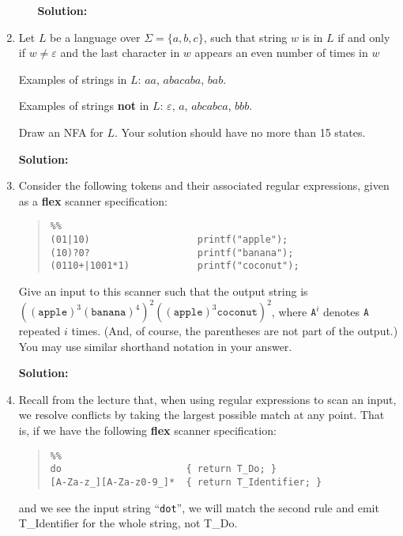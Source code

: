\documentclass[11pt]{article}
\renewcommand{\epsilon}{\varepsilon}
\begin{document}
\begin{enumerate}
\begin{enumerate}
\begin{tikzpicture}[auto]
    \end{tikzpicture}

    \textbf{Solution:}
\end{enumerate}

\newpage

\item Let $L$ be a language over $\Sigma = \{a, b, c\}$, such that string $w$ is in $L$ if and only if $w\neq\epsilon$ and the last character in $w$ appears an even number of times in $w$

Examples of strings in $L$: $aa$, $abacaba$, $bab$.

Examples of strings \textbf{not} in $L$: $\epsilon$, $a$, $abcabca$, $bbb$.

Draw an NFA for $L$.  Your solution should have no more than 15 states.

\textbf{Solution:}

\newpage

\item Consider the following tokens and their associated regular expressions, given as a \textbf{flex} scanner specification:
\begin{quote}
\begin{lstlisting}
%%
(01|10)                   printf("apple");
(10)?0?                   printf("banana");
(0110+|1001*1)            printf("coconut");
\end{lstlisting}
\end{quote}
Give an input to this scanner such that the output string is $((\mathtt{apple})^3 (\mathtt{banana})^4)^2 ((\mathtt{apple})^3\mathtt{coconut})^2$, where $\mathtt{A}^i$ denotes $\mathtt{A}$ repeated $i$ times.   (And, of course, the parentheses are not part of the output.)  You may use similar shorthand notation in your answer.

\textbf{Solution:}


\newpage

\item Recall from the lecture that, when using regular expressions to scan an input, we resolve conflicts by taking the largest possible match at any point. That is, if we have the following \textbf{flex} scanner specification:
\begin{quote}
\begin{lstlisting}
%%
do                      { return T_Do; }
[A-Za-z_][A-Za-z0-9_]*  { return T_Identifier; }
\end{lstlisting}
\end{quote}
and we see the input string ``\texttt{dot}'', we will match the second rule and emit T\_Identifier for the whole string, not T\_Do.


\end{enumerate}
\end{document}
